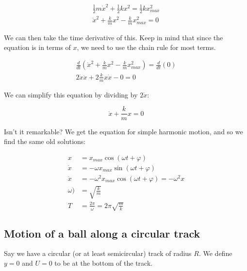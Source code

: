 \begin{align}
\frac{1}{2} m \dot{x}^2 + \frac{1}{2} k x^2 = \frac{1}{2} k x_{max}^2\\
\dot{x}^2 + \frac{k}{m} x^2 - \frac{k}{m} x_{max}^2 = 0
\end{align}

We can then take the time derivative of this. Keep in mind that since the equation is in terms of $x$, we need to use the chain rule for most terms.

\begin{align}
\frac{d}{dt} \left(\dot{x}^2 + \frac{k}{m} x^2 - \frac{k}{m} x_{max}^2\right) = \frac{d}{dt} (0)\\
2 \dot{x} \ddot{x} + 2 \frac{k}{m} x \dot{x} - 0 = 0
\end{align}

We can simplify this equation by dividing by $2 \dot{x}$:

\begin{equation}
\ddot{x} + \frac{k}{m} x = 0
\end{equation}

Isn't it remarkable? We get the equation for simple harmonic motion, and so we find the same old solutions:

\begin{align}
x        &= x_{max} \cos(\omega t + \varphi)\\
\dot{x}  &= - \omega x_{max} \sin(\omega t + \varphi)\\
\ddot{x} &= - \omega^2 x_{max} \cos(\omega t + \varphi) = -\omega^2 x\\
\omega  )    &= \sqrt{\frac{k}{m}}\\
T           &= \frac{2 \pi}{\omega} = 2 \pi \sqrt{\frac{m}{k}}
\end{align}

\subsection{Motion of a ball along a circular track}

Say we have a circular (or at least semicircular) track of radius $R$. We define $y = 0$ and $U = 0$ to be at the bottom of the track.

